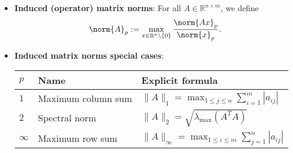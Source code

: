 \documentclass{report}
\begin{document}
\begin{itemize}
        \item \textbf{Induced (operator) matrix norms}: For all $A\in \mathbb{R}^{n\times m}$, we define
            \begin{align*}
                \norm{A}_{p} := \max_{x\in\mathbb{R}^{n} \setminus \{0\}} \frac{\norm{Ax}_{p}}{\norm{x}_{p}}
            .\end{align*}
        \item \textbf{Induced matrix norms special cases}:
            \begin{center}
                \begin{tabular}{p{1cm}|p{5cm}|p{5cm}}
                    \toprule
                    $p$ & \textbf{Name} & \textbf{Explicit formula} \\
                    \midrule
                    $1$ & Maximum column sum &
                    $\displaystyle \|A\|_{1} = \max_{1 \leq j \leq n} \sum_{i=1}^{m} |a_{ij}|$ \\[3ex]
                    $2$ & Spectral norm &
                    $\displaystyle \|A\|_{2} = \sqrt{\lambda_{\max}(A^{T}A)}$ \\[3ex]
                    $\infty$ & Maximum row sum &
                    $\displaystyle \|A\|_{\infty} = \max_{1 \leq i \leq m} \sum_{j=1}^{n} |a_{ij}|$ \\
                    \bottomrule
                \end{tabular}
            \end{center}



    \end{itemize}

    \pagebreak 
\end{document}
